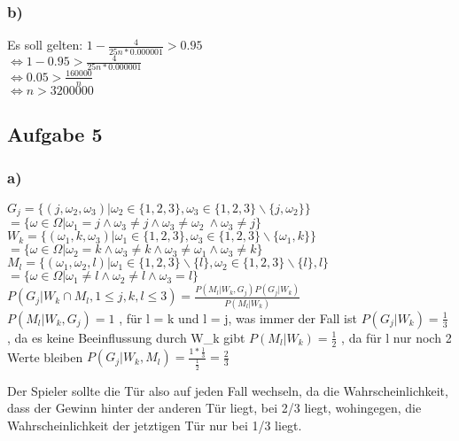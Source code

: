\documentclass[11pt]{amsart}
\begin{document}
\subsubsection{b)}

Es soll gelten: $1 - \frac{4}{25n * 0.000001} > 0.95$ \\
$\Leftrightarrow 1-0.95 > \frac{4}{25n * 0.000001}$ \\
$\Leftrightarrow 0.05 > \frac{160000}{n}$ \\
$\Leftrightarrow n > 3 200 000$

\subsection{Aufgabe 5}

\subsubsection{a)}

$G_j = \{ (j,\omega_2,\omega_3) | \omega_2 \in \{ 1,2,3 \}, \omega_3 \in \{ 1,2,3 \} \backslash  \{ j , \omega_2 \} \}$ \\
        $= \{ \omega \in \Omega | \omega_1 = j \wedge \omega_3 \not = j \wedge \omega_3 \not = \omega_2\ \wedge \omega_3 \not = j \}$ \\
$W_k = \{ ( \omega_1 , k , \omega_3 ) | \omega_1 \in \{ 1,2,3 \} , \omega_3 \in \{ 1, 2, 3 \} \backslash \{\omega_1 , k \} \}$ \\
     $= \{ \omega \in \Omega | \omega_2 = k \wedge \omega_3 \not = k \wedge \omega_3 \not = \omega_1 \wedge \omega_3 \not = k \}$ \\
$M_l = \{ ( \omega_1 , \omega_2 , l ) | \omega_1 \in \{ 1,2,3 \} \backslash \{ l \} , \omega_2 \in \{ 1, 2, 3 \}  \backslash \{ l \} , l \}$ \\
     $= \{ \omega \in \Omega | \omega_1 \not = l \wedge \omega_2 \not = l \wedge \omega_3 = l \}$ \\

$P(G_j | W_k \cap M_l, 1 \leq j,k,l \leq 3) = \frac{P( M_l | W_k , G_j) P(G_j | W_k)}{P(M_l | W_k)}$ \\
$P(M_l | W_k , G_j ) = 1$ , für l \not = k und l \not = j, was immer der Fall ist
$P(G_j | W_k) = \frac{1}{3}$ , da es keine Beeinflussung durch W_k gibt
$P(M_l | W_k) = \frac{1}{2}$ , da für l nur noch 2 Werte bleiben
$P(G_j | W_k , M_l) = \frac{1 * \frac{1}{3}}{\frac{1}{2}} = \frac{2}{3}$

Der Spieler sollte die Tür also auf jeden Fall wechseln, da die Wahrscheinlichkeit, dass der Gewinn
hinter der anderen Tür liegt, bei 2/3 liegt, wohingegen, die Wahrscheinlichkeit der jetztigen Tür
nur bei 1/3 liegt.
\end{document}
